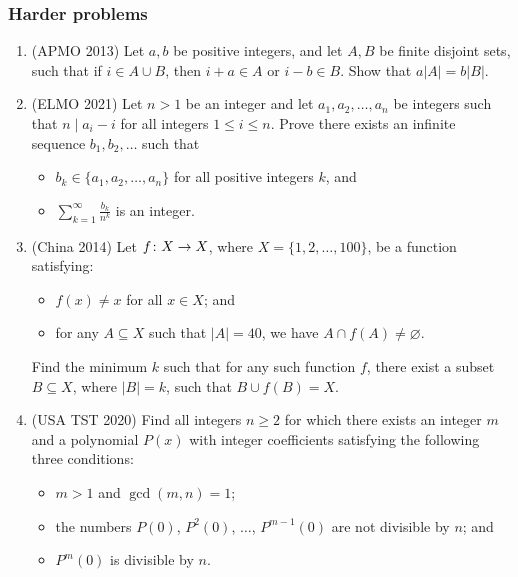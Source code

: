 \documentclass[11pt,paper=letter]{scrartcl}
\begin{document}
\subsubsection*{Harder problems}

\begin{enumerate}[resume]
\item (APMO 2013) Let $a, b$ be positive integers, and let $A, B$ be finite disjoint sets, such that if $i \in A \cup B$, then $i + a \in A$ or $i - b \in B$. Show that $a|A| = b|B|$.
\hints{\ref{h:29} \ref{h:30}}

\item (ELMO 2021) Let $n > 1$ be an integer and let $a_1, a_2, \ldots, a_n$ be integers such that $n \mid a_i-i$ for all integers $1 \leq i \leq n$. Prove there exists an infinite sequence $b_1,b_2, \ldots$ such that
\begin{itemize}
  \item $b_k\in\{a_1,a_2,\ldots, a_n\}$ for all positive integers $k$, and
  \item $\displaystyle\sum\limits_{k=1}^{\infty}\frac{b_k}{n^k}$ is an integer. \hints{\ref{h:10} \ref{h:11}}
\end{itemize}

\item (China 2014) Let $f \colon X \to X$, where $X=\{1,2,\ldots ,100\}$, be a function satisfying:
\begin{itemize}
  \item $f(x)\neq x$ for all $x \in X$; and
  \item for any $A \subseteq X$ such that $|A|=40$, we have $A \cap f(A) \neq\varnothing$.
\end{itemize}
Find the minimum $k$ such that for any such function $f$, there exist a subset $B \subseteq X$, where $|B| = k$, such that $B\cup f(B)=X$.
\hints{\ref{h:12} \ref{h:13}}

\item (USA TST 2020) Find all integers $n \ge 2$ for which there exists an integer $m$ and a polynomial $P(x)$ with integer coefficients satisfying the following three conditions:
\begin{itemize}
\item $m > 1$ and $\gcd(m,n) = 1$;
\item the numbers $P(0)$, $P^2(0)$, $\ldots$, $P^{m-1}(0)$ are not divisible by $n$; and
\item $P^m(0)$ is divisible by $n$.
\hints{\ref{h:17} \ref{h:18}}
\end{itemize}


\end{enumerate}
\end{document}
